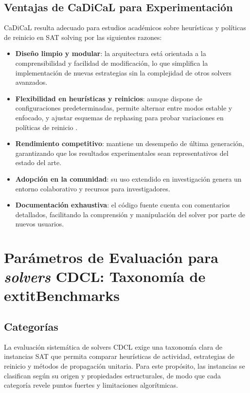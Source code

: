 \subsection{Ventajas de CaDiCaL para Experimentación}
CaDiCaL resulta adecuado para estudios académicos sobre heurísticas y políticas de reinicio en SAT solving por las siguientes razones:
\begin{itemize}
  \item \textbf{Diseño limpio y modular}: la arquitectura está orientada a la comprensibilidad y facilidad de modificación, lo que simplifica la implementación de nuevas estrategias sin la complejidad de otros solvers avanzados.
  \item \textbf{Flexibilidad en heurísticas y reinicios}: aunque dispone de configuraciones predeterminadas, permite alternar entre modos estable y enfocado, y ajustar esquemas de rephasing para probar variaciones en políticas de reinicio \cite{cai2022better_heuristics}. %
  \item \textbf{Rendimiento competitivo}: mantiene un desempeño de última generación, garantizando que los resultados experimentales sean representativos del estado del arte.
  \item \textbf{Adopción en la comunidad}: su uso extendido en investigación genera un entorno colaborativo y recursos para investigadores.
  \item \textbf{Documentación exhaustiva}: el código fuente cuenta con comentarios detallados, facilitando la comprensión y manipulación del solver por parte de nuevos usuarios.
\end{itemize} \cite{cadical2024}



\section{Parámetros de Evaluación para \textit{solvers} CDCL: Taxonomía de extit{Benchmarks}}
\label{sec:tipos-problemas}
\subsection{Categor\'ias}
\label{subsec:problem-categor}
La evaluación sistemática de solvers CDCL exige una taxonomía clara de instancias SAT que permita comparar heurísticas de actividad, estrategias de reinicio y métodos de propagación unitaria. Para este propósito, las instancias se clasifican según su origen y propiedades estructurales, de modo que cada categoría revele puntos fuertes y limitaciones algorítmicas.

